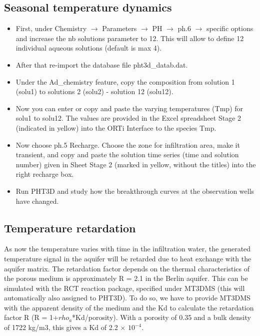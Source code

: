 \subsection[Seasonal temperature dynamics]
{Seasonal temperature dynamics}

\begin{itemize}
\item First, under {\color{blue}Chemistry} $\rightarrow$ 
{\color{blue}Parameters} $\rightarrow$ {\color{blue}PH} 
$\rightarrow$ {\color{blue}ph.6} $\rightarrow$ 
{\color{blue}specific options} and increase the {\color{blue}nb solutions parameter} to {\color{blue}12}.
This will allow to define 12 individual aqueous solutions (default is max 4).  

\item After that re-import the database file {\color{blue}pht3d\_datab.dat}.

\item Under the {\color{blue}Ad\_chemistry} feature, copy the composition from 
solution 1 ({\color{blue}solu1}) to solutions 2 ({\color{blue}solu2}) - solution 12 ({\color{blue}solu12}). 

\item Now you can enter or copy and paste the varying temperatures ({\color{blue}Tmp}) 
for {\color{blue}solu1} to {\color{blue}solu12}. 
The values are provided in the Excel spreadsheet {\color{blue}Stage 2} (indicated in yellow) 
into the ORTi Interface to the species Tmp. 

\item Now choose {\color{blue}ph.5 Recharge}. 
Choose the zone for infiltration area, make it transient, and copy and paste the solution time series 
(time and solution number) given in Sheet {\color{blue}Stage 2} 
(marked in yellow, without the titles) into the right recharge box.
 
\item Run PHT3D and study how the breakthrough curves at the observation wells have changed.
 
\end{itemize}

\subsection[Temperature retardation]{Temperature retardation}

As now the temperature varies with time in the infiltration water, 
the generated temperature signal in the aquifer will be retarded due to 
heat exchange with the aquifer matrix. The retardation factor depends on the 
thermal characteristics of the porous medium is approximately R = 2.1 in the Berlin aquifer. 
This can be simulated with the {\color{blue}RCT} reaction package, specified 
under MT3DMS (this will automatically also assigned to PHT3D). 
To do so, we have to provide MT3DMS with the apparent density of the medium 
and the Kd to calculate the retardation factor R (R = 1+$rho_{a}$*Kd/porosity). 
With a porosity of 0.35 and a bulk density of 1722 kg/m3, this gives a Kd of 2.2 $\times$ $10^{-4}$. 

